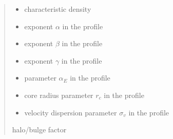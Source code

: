 \documentclass[letterpaper,10pt,english]{sphinxmanual}
\begin{document}
\begin{fulllineitems}
\begin{quote}
\begin{description}
\begin{itemize}
\item {} 
\sphinxAtStartPar
{} \textendash{} characteristic density

\item {} 
\sphinxAtStartPar
{} \textendash{} exponent \(\alpha\) in the {\hyperref[\detokenize{diffsph.profiles:diffsph.profiles.templates.hdz}]{}} profile

\item {} 
\sphinxAtStartPar
{} \textendash{} exponent \(\beta\) in the {\hyperref[\detokenize{diffsph.profiles:diffsph.profiles.templates.hdz}]{}} profile

\item {} 
\sphinxAtStartPar
{} \textendash{} exponent \(\gamma\) in the {\hyperref[\detokenize{diffsph.profiles:diffsph.profiles.templates.hdz}]{}} profile

\item {} 
\sphinxAtStartPar
{} \textendash{} parameter \(\alpha_E\) in the {\hyperref[\detokenize{diffsph.profiles:diffsph.profiles.templates.enst}]{}} profile

\item {} 
\sphinxAtStartPar
{} \textendash{} core radius parameter \(r_c\) in the {\hyperref[\detokenize{diffsph.profiles:diffsph.profiles.templates.cnfw}]{}} profile

\item {} 
\sphinxAtStartPar
{} \textendash{} velocity dispersion parameter \(\sigma_v\) in the {\hyperref[\detokenize{diffsph.profiles:diffsph.profiles.templates.sis}]{}} profile

\end{itemize}

\sphinxAtStartPar
halo/bulge factor

\end{description}\end{quote}

\end{fulllineitems}
\end{document}

